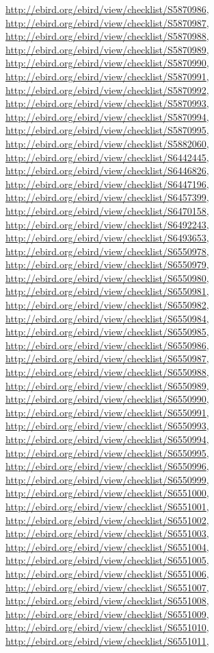\documentclass[9pt, article]{memoir}
\begin{document}
\begin{multicols}{2}
\url{http://ebird.org/ebird/view/checklist/S5870986}, 
\url{http://ebird.org/ebird/view/checklist/S5870987}, 
\url{http://ebird.org/ebird/view/checklist/S5870988}, 
\url{http://ebird.org/ebird/view/checklist/S5870989}, 
\url{http://ebird.org/ebird/view/checklist/S5870990}, 
\url{http://ebird.org/ebird/view/checklist/S5870991}, 
\url{http://ebird.org/ebird/view/checklist/S5870992}, 
\url{http://ebird.org/ebird/view/checklist/S5870993}, 
\url{http://ebird.org/ebird/view/checklist/S5870994}, 
\url{http://ebird.org/ebird/view/checklist/S5870995}, 
\url{http://ebird.org/ebird/view/checklist/S5882060}, 
\url{http://ebird.org/ebird/view/checklist/S6442445}, 
\url{http://ebird.org/ebird/view/checklist/S6446826}, 
\url{http://ebird.org/ebird/view/checklist/S6447196}, 
\url{http://ebird.org/ebird/view/checklist/S6457399}, 
\url{http://ebird.org/ebird/view/checklist/S6470158}, 
\url{http://ebird.org/ebird/view/checklist/S6492243}, 
\url{http://ebird.org/ebird/view/checklist/S6493653}, 
\url{http://ebird.org/ebird/view/checklist/S6550978}, 
\url{http://ebird.org/ebird/view/checklist/S6550979}, 
\url{http://ebird.org/ebird/view/checklist/S6550980}, 
\url{http://ebird.org/ebird/view/checklist/S6550981}, 
\url{http://ebird.org/ebird/view/checklist/S6550982}, 
\url{http://ebird.org/ebird/view/checklist/S6550984}, 
\url{http://ebird.org/ebird/view/checklist/S6550985}, 
\url{http://ebird.org/ebird/view/checklist/S6550986}, 
\url{http://ebird.org/ebird/view/checklist/S6550987}, 
\url{http://ebird.org/ebird/view/checklist/S6550988}, 
\url{http://ebird.org/ebird/view/checklist/S6550989}, 
\url{http://ebird.org/ebird/view/checklist/S6550990}, 
\url{http://ebird.org/ebird/view/checklist/S6550991}, 
\url{http://ebird.org/ebird/view/checklist/S6550993}, 
\url{http://ebird.org/ebird/view/checklist/S6550994}, 
\url{http://ebird.org/ebird/view/checklist/S6550995}, 
\url{http://ebird.org/ebird/view/checklist/S6550996}, 
\url{http://ebird.org/ebird/view/checklist/S6550999}, 
\url{http://ebird.org/ebird/view/checklist/S6551000}, 
\url{http://ebird.org/ebird/view/checklist/S6551001}, 
\url{http://ebird.org/ebird/view/checklist/S6551002}, 
\url{http://ebird.org/ebird/view/checklist/S6551003}, 
\url{http://ebird.org/ebird/view/checklist/S6551004}, 
\url{http://ebird.org/ebird/view/checklist/S6551005}, 
\url{http://ebird.org/ebird/view/checklist/S6551006}, 
\url{http://ebird.org/ebird/view/checklist/S6551007}, 
\url{http://ebird.org/ebird/view/checklist/S6551008}, 
\url{http://ebird.org/ebird/view/checklist/S6551009}, 
\url{http://ebird.org/ebird/view/checklist/S6551010}, 
\url{http://ebird.org/ebird/view/checklist/S6551011}, 

\end{multicols}
\end{document}
